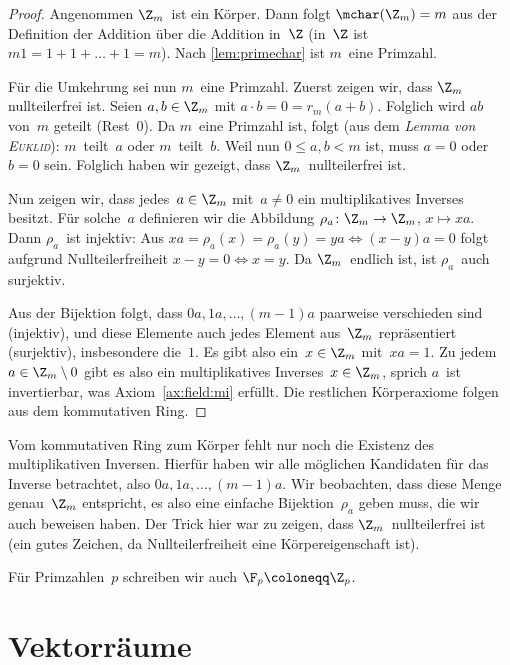 \documentclass[a4paper]{article}
\begin{document}
\begin{proof}
    Angenommen $\Z_m$~ist ein Körper. Dann folgt $\mchar(\Z_m) = m$ aus der Definition der Addition über die Addition in~$\Z$ (in~$\Z$ ist $m1 = 1+1+\dots+1 = m$). Nach \cref{lem:primechar} ist $m$~eine Primzahl.

    Für die Umkehrung sei nun $m$~eine Primzahl. Zuerst zeigen wir, dass $\Z_m$ nullteilerfrei ist. Seien $a, b \in \Z_m$ mit $a\cdot b = 0 = r_m(a+b)$. Folglich wird $ab$ von~$m$ geteilt (Rest~$0$). Da $m$~eine Primzahl ist, folgt (aus dem \emph{Lemma von \textsc{Euklid}}): $m$~teilt~$a$ oder $m$~teilt~$b$. Weil nun $0 \leq a, b < m$ ist, muss $a = 0$ oder $b = 0$ sein. Folglich haben wir gezeigt, dass $\Z_m$~nullteilerfrei ist.

    Nun zeigen wir, dass jedes~$a \in \Z_m$ mit~$a \neq 0$ ein multiplikatives Inverses besitzt. Für solche~$a$ definieren wir die Abbildung $\rho_a\colon \Z_m \to \Z_m$, $x \mapsto xa$. Dann $\rho_a$~ist injektiv: Aus $xa = \rho_a(x) = \rho_a(y) = ya \iff (x-y)a = 0$ folgt aufgrund Nullteilerfreiheit $x-y = 0 \iff x = y$. Da $\Z_m$~endlich ist, ist $\rho_a$~auch surjektiv.

    Aus der Bijektion folgt, dass $0a, 1a, \dots, (m-1)a$ paarweise verschieden sind (injektiv), und diese Elemente auch jedes Element aus~$\Z_m$ repräsentiert (surjektiv), insbesondere die~$1$. Es gibt also ein~$x \in \Z_m$ mit~$xa = 1$. Zu jedem~$a \in \Z_m \setminus{0}$ gibt es also ein multiplikatives Inverses~$x \in \Z_m$, sprich $a$~ist invertierbar, was Axiom~\ref{ax:field:mi} erfüllt. Die restlichen Körperaxiome folgen aus dem kommutativen Ring.
\end{proof}

Vom kommutativen Ring zum Körper fehlt nur noch die Existenz des multiplikativen Inversen. Hierfür haben wir alle möglichen Kandidaten für das Inverse betrachtet, also $0a, 1a, \dots, (m-1)a$. Wir beobachten, dass diese Menge genau~$\Z_m$ entspricht, es also eine einfache Bijektion~$\rho_a$ geben muss, die wir auch beweisen haben. Der Trick hier war zu zeigen, dass $\Z_m$~nullteilerfrei ist (ein gutes Zeichen, da Nullteilerfreiheit eine Körpereigenschaft ist).

\begin{notation}
    Für Primzahlen~$p$ schreiben wir auch $\F_p \coloneqq \Z_p$.
\end{notation}

\section{Vektorräume}
\end{document}
